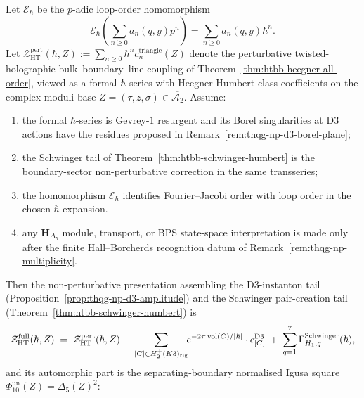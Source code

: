 \begin{theorem}
\label{thm:thqg-np-d3-completion}
Let \(\mathscr E_\hbar\) be the \(p\)-adic loop-order homomorphism
\[
\mathscr E_\hbar\!\left(\sum_{n\geq 0}a_n(q,y)p^n\right)
=\sum_{n\geq 0}a_n(q,y)\hbar^n .
\]
Let
$\mathcal{Z}^{\mathrm{pert}}_{\mathrm{HT}}(\hbar, Z)
:= \sum_{n\geq 0}\hbar^n c_n^{\mathrm{triangle}}(Z)$
denote the perturbative twisted-holographic bulk--boundary--line
coupling of Theorem~\ref{thm:htbb-heegner-all-order}, viewed as a
formal $\hbar$-series with Heegner-Humbert-class coefficients on the
complex-moduli base \(Z=(\tau,z,\sigma)\in\overline{\mathcal{A}_2}\). Assume:
\begin{enumerate}[label=\textup{(\alph*)}]
\item the formal $\hbar$-series is Gevrey-$1$ resurgent and its
Borel singularities at D$3$ actions have the residues proposed in
Remark~\ref{rem:thqg-np-d3-borel-plane};
\item the Schwinger tail of Theorem~\ref{thm:htbb-schwinger-humbert}
is the boundary-sector non-perturbative correction in the same
transseries;
\item the homomorphism \(\mathscr E_\hbar\) identifies Fourier--Jacobi
order with loop order in the chosen $\hbar$-expansion.
\item any $\mathbf H_{\Delta_5}$ module, transport, or BPS
state-space interpretation is made only after the finite
Hall--Borcherds recognition datum of
Remark~\ref{rem:thqg-np-multiplicity}.
\end{enumerate}
Then the non-perturbative presentation assembling the D$3$-instanton tail
(Proposition~\ref{prop:thqg-np-d3-amplitude}) and the Schwinger
pair-creation tail
(Theorem~\ref{thm:htbb-schwinger-humbert}) is
\begin{equation}\label{eq:thqg-np-completion}
 \mathcal{Z}^{\mathrm{full}}_{\mathrm{HT}}(\hbar, Z)
 \;=\; \mathcal{Z}^{\mathrm{pert}}_{\mathrm{HT}}(\hbar, Z)
 \;+\;\!\!\sum_{[C]\in H_2^+(K3)_{\mathrm{rig}}}\!\!
 e^{-2\pi\operatorname{vol}(C)/|\hbar|}\cdot c^{\mathrm{D3}}_{[C]}
 \;+\; \sum_{q = 1}^{7}\Gamma^{\mathrm{Schwinger}}_{H_1, q}(\hbar),
\end{equation}
and its automorphic part is the separating-boundary normalised
Igusa square \(\Phi_{10}^{\mathrm{un}}(Z)=\Delta_5(Z)^2\):
\begin{equation}\label{eq:thqg-np-phi10-identity}

\end{equation}
\end{theorem}
